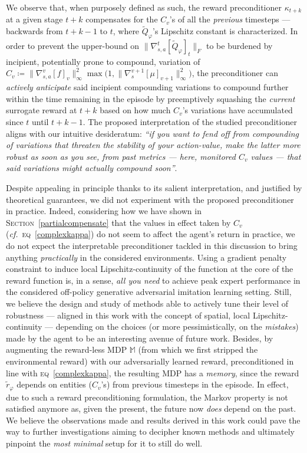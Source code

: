 We observe that, when purposely defined as such,
the reward preconditioner $\kappa_{t+k}$
at a given stage $t+k$ compensates for the $C_v$'s
of all the \emph{previous} timesteps --- backwards from $t+k-1$ to $t$, where $\widetilde{Q}_\varphi$'s
Lipschitz constant is characterized.
In order to prevent the upper-bound on $\lVert \nabla_{s,a}^t[\widetilde{Q}_\varphi]_t \rVert _F$
to be burdened by incipient, potentially prone to compound, variation of
$C_v \coloneqq \lVert\nabla_{s,a}^v[f]_v\rVert _\infty^2
\max \big(1, \lVert\nabla_s^{v+1}[\mu]_{v+1}\rVert _\infty^2\big)$,
the preconditioner can \emph{actively anticipate} said incipient compounding variations to compound further
within the time remaining in the episode by preemptively squashing the \emph{current} surrogate reward at $t+k$
based on how much $C_v$'s variations have accumulated since $t$ until $t+k-1$.
The proposed interpretation of the studied preconditioner aligns with our intuitive desideratum:
\textit{``if you want to fend off from compounding of variations that threaten the stability of
your action-value, make the latter more robust as soon as you see, from past metrics
--- here, monitored $C_v$ values --- that said
variations might actually compound soon''}.

Despite appealing in principle thanks to its salient interpretation,
and justified by theoretical guarantees,
we did not experiment with the proposed preconditioner in practice.
Indeed, considering how we have shown in \textsc{Section}~\ref{partialcompensate}
that the values in effect taken by $C_v$ (\textit{cf.}~\textsc{eq}~\ref{complexkappa}) do not seem to affect
the agent's return in practice,
we do not expect the interpretable preconditioner tackled in this discussion
to bring anything \emph{practically} in the considered environments.
Using a gradient penalty constraint to induce local Lipschitz-continuity of the
function at the core of the reward function is, in a sense, \emph{all you need}
to achieve peak expert performance in the considered off-policy
generative adversarial imitation learning setting.
Still, we believe the design and study of methods able to actively tune their level of robustness
--- aligned in this work with the concept of spatial, local Lipschitz-continuity ---
depending on the choices (or more pessimistically, on the \emph{mistakes}) made by the agent
to be an interesting avenue of future work.
Besides,
by augmenting the reward-less MDP $\mathbb{M}$ (from which we first stripped the environmental reward)
with our adversarially learned reward, preconditioned in line with \textsc{eq}~\ref{complexkappa},
the resulting MDP has a \emph{memory},
since the reward $\tilde{r}_\varphi$ depends on entities
($C_v$'s)
from previous timesteps in the episode.
In effect, due to such a reward preconditioning formulation, the Markov property is not satisfied anymore as,
given the present, the future now \emph{does} depend on the past.
We believe the observations made and results derived in this work
could pave the way to further investigations aiming to decipher known methods and ultimately pinpoint
the \emph{most minimal} setup for it to still do well.


